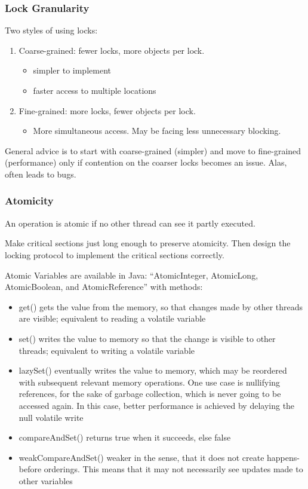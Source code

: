 \documentclass[letterpaper,12pt]{article}
\begin{document}
\subsubsection{Lock Granularity}
Two styles of using locks:\begin{enumerate}
      \item Coarse-grained: fewer locks, more objects per lock.\begin{itemize}
            \item simpler to implement
            \item faster access to multiple locations
      \end{itemize}
      \item Fine-grained: more locks, fewer objects per lock.\begin{itemize}
            \item More simultaneous access. May be facing less unnecessary blocking.
      \end{itemize}
\end{enumerate}
General advice is to start with coarse-grained (simpler) and move to fine-grained (performance) only if contention on the coarser locks becomes an issue.  Alas, often leads to bugs.
\subsubsection{Atomicity}
An operation is atomic if no other thread can see it partly executed.

Make critical sections just long enough to preserve atomicity. Then design the locking protocol to implement the critical sections correctly. 

Atomic Variables are available in Java: ``AtomicInteger, AtomicLong, AtomicBoolean, and AtomicReference'' with methods:\begin{itemize}
      \item get() gets the value from the memory, so that changes made by other threads are visible; equivalent to reading a volatile variable
      \item set() writes the value to memory so that the change is visible to other threads; equivalent to writing a volatile variable
      \item lazySet() eventually writes the value to memory, which may be reordered with subsequent relevant memory operations. One use case is nullifying references, for the sake of garbage collection, which is never going to be accessed again. In this case, better performance is achieved by delaying the null volatile write
      \item compareAndSet() returns true when it succeeds, else false
      \item weakCompareAndSet() weaker in the sense, that it does not create happens-before orderings. This means that it may not necessarily see updates made to other variables
\end{itemize}
\end{document}
